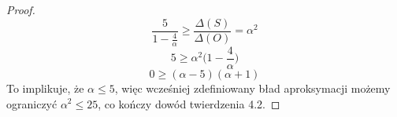\begin{proof}
    \begin{equation}
        \frac{5}{1-\frac{4}{\alpha}} \geq \frac{\Delta(S)}{\Delta(O)} = \alpha^{2}
    \end{equation}
    \begin{equation}
        5 \geq \alpha^{2} \Big(1 - \frac{4}{\alpha} \Big)
    \end{equation}
    \begin{equation}
        0 \geq (\alpha - 5)(\alpha + 1)
    \end{equation}
    To implikuje, że $\alpha \leq 5$, więc wcześniej zdefiniowany bład aproksymacji możemy ograniczyć $\alpha^{2} \leq 25$, co kończy dowód twierdzenia 4.2.
\end{proof}